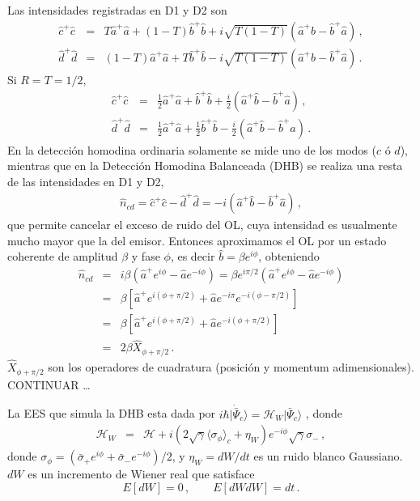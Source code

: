 \documentclass[twocolumn,aps,eqsecnum,showkeys,amsmath]{revtex4}
\newcommand{\mcH}{\mathcal{H}} 	%
\providecommand{\ket}[1]{\lvert #1 \rangle}
\begin{document}
Las intensidades registradas en D1 y D2 son 
%
\begin{eqnarray*}
\hat{c}^+ \hat{c} &=& T \hat{a}^+ \hat{a} +(1-T) \hat{b}^+ \hat{b} 
	+i \sqrt{T(1-T)}  \left( \hat{a}^+ \hat{b} -\hat{b}^+ \hat{a}  \right) \,, \\ 
\hat{d}^+ \hat{d} &=& (1-T) \hat{a}^+ \hat{a} +T \hat{b}^+ \hat{b} 
	-i \sqrt{T(1-T)}  \left( \hat{a}^+ \hat{b} -\hat{b}^+ \hat{a}  \right) \,. 
\end{eqnarray*}
Si $R=T=1/2$, 
%
\begin{eqnarray*}
\hat{c}^+ \hat{c} &=& \frac{1}{2} \hat{a}^+ \hat{a} + \hat{b}^+ \hat{b} 
	+\frac{i}{2} \left( \hat{a}^+ \hat{b} -\hat{b}^+ \hat{a}  \right) \,, \\ 
\hat{d}^+ \hat{d} &=& \frac{1}{2} \hat{a}^+ \hat{a} +\frac{1}{2} \hat{b}^+ \hat{b} 
	- \frac{i}{2} \left( \hat{a}^+ \hat{b} -\hat{b}^+ \hat{a}  \right) \,. 
\end{eqnarray*}
En la detecci\'on homodina ordinaria solamente se mide uno de los modos 
($c$ \'o $d$), mientras que en la Detecci\'on Homodina Balanceada (DHB) 
se realiza una resta de las intensidades en D1 y D2, 
%
\begin{eqnarray*}
\hat{n}_{cd} = \hat{c}^+ \hat{c} - \hat{d}^+ \hat{d} 
= - i \left( \hat{a}^+ \hat{b} -\hat{b}^+ \hat{a}  \right)  \,,  
\end{eqnarray*}
que permite cancelar el exceso de ruido del OL, cuya intensidad es 
usualmente mucho mayor que la del emisor. Entonces aproximamos el 
OL por un estado coherente de amplitud $\beta$ y fase $\phi$, es decir 
$\hat{b} = \beta e^{i\phi}$, obteniendo 
%
\begin{eqnarray*}
\hat{n}_{cd} &=& i \beta \left( \hat{a}^+ e^{i\phi} - \hat{a} e^{-i \phi}  \right) 
	= \beta e^{i \pi/2} \left( \hat{a}^+ e^{i\phi} - \hat{a} e^{-i \phi}  \right) \\
&=& \beta \left[ \hat{a}^+ e^{i(\phi +\pi/2)} 
	+ \hat{a} e^{-i\pi} e^{-i( \phi -\pi/2)}  \right] 	\\ 
&=& \beta \left[ \hat{a}^+ e^{i(\phi +\pi/2)} 
	+ \hat{a} e^{-i( \phi +\pi/2)}  \right] 	\\ 	
&=& 2 \beta \hat{X}_{\phi +\pi/2} \,. 
\end{eqnarray*}
$\hat{X}_{\phi +\pi/2}$ son los operadores de cuadratura (posici\'on y 
momentum adimensionales). 
\newline CONTINUAR \ldots    

La EES que simula la DHB esta dada por 
$i \hbar \ket{\dot{\bar{\Psi}}_c} = {\mcH}_W \ket{\bar{\Psi}_c}$ 
\cite{Carm93,WiMi93b}, donde 
%
\begin{eqnarray}
\mcH_W &=& \mcH + i \left(2\sqrt{\gamma} \langle \sigma_{\phi}  \rangle_c  
	+\eta_W \right) e^{-i\phi} \sqrt{\gamma} \sigma_- \,,	
\end{eqnarray}
donde 
$\sigma_{\phi}  =  (\bar{\sigma}_+ e^{i\phi} +\bar{\sigma}_- e^{-i\phi} )/2$, 
y $\eta_W=dW/dt$ es un ruido blanco Gaussiano. $dW$ es un incremento 
de Wiener real que satisface 
%
\begin{equation}
E[dW]=0 \,, 	\qquad E[dWdW]=dt \,.
\end{equation}
\end{document}
